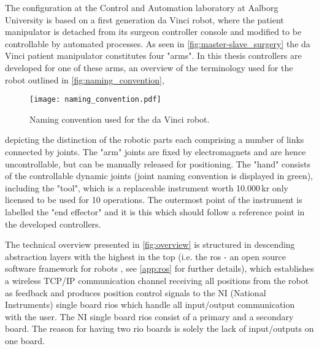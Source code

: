 \vspace{-2mm}
The configuration at the Control and Automation laboratory at Aalborg University is based on a first generation da Vinci robot, where the patient manipulator is detached from its surgeon controller console and modified to be controllable by automated processes. %
As seen in \autoref{fig:master-slave_surgery} the da Vinci patient manipulator constitutes four "arms". In this thesis controllers are developed for one of these arms, 
an overview of the terminology used for the robot  outlined in \autoref{fig:naming_convention},
\begin{figure}[htbp]
\centering
\texttt{[image: naming\_convention.pdf]}
\caption{Naming convention used for the da Vinci robot.}
\label{fig:naming_convention}
\end{figure}
depicting the distinction of the robotic parts each comprising a number of links connected by joints. 
The  "arm"  joints are fixed by electromagnets and are hence uncontrollable, but can be manually released for positioning. 
The  "hand" consists of the controllable dynamic joints (joint naming convention is displayed in green), including the "tool", which is a replaceable instrument worth 10.000\,kr only licensed to be used for 10 operations. The outermost point of the instrument is labelled the "end effector" and it is  this which should follow a reference point in the developed controllers.

%
%
The technical overview presented in \autoref{fig:overview} is structured in descending abstraction layers with the highest in the top (i.e. the \gls{ros} - an open source software framework for robots \citep{bib:ros}, see \autoref{app:ros} for further details), which establishes a wireless TCP/IP communication channel receiving all positions from the robot as feedback and produces position control signals to the NI (National Instruments) single board \glspl{rio} which handle all input/output communication with the user. The NI single board \glspl{rio} consist of a primary and a secondary board. The reason for having two \gls{rio} boards is solely the lack of input/outputs on one board.


